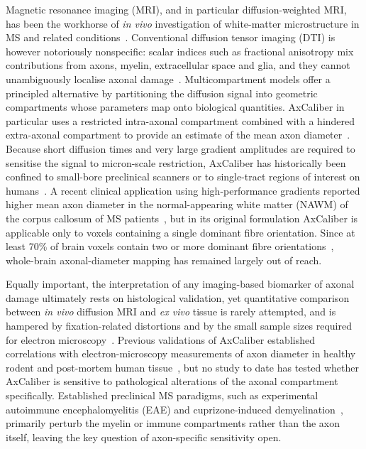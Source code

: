 \documentclass[11pt]{article}
\begin{document}
Magnetic resonance imaging (MRI), and in particular diffusion-weighted MRI, has been the workhorse of \emph{in vivo} investigation of white-matter microstructure in MS and related conditions~\cite{inglese2010diffusion}. Conventional diffusion tensor imaging (DTI) is however notoriously nonspecific: scalar indices such as fractional anisotropy mix contributions from axons, myelin, extracellular space and glia, and they cannot unambiguously localise axonal damage~\cite{desantis2014accuracy}. Multicompartment models offer a principled alternative by partitioning the diffusion signal into geometric compartments whose parameters map onto biological quantities. AxCaliber in particular uses a restricted intra-axonal compartment combined with a hindered extra-axonal compartment to provide an estimate of the mean axon diameter~\cite{assaf2008axcaliber,alexander2010orientationally,sepehrband2016towards}. Because short diffusion times and very large gradient amplitudes are required to sensitise the signal to micron-scale restriction, AxCaliber has historically been confined to small-bore preclinical scanners or to single-tract regions of interest on humans~\cite{jones2018microstructural,barazany2009invivo}. A recent clinical application using high-performance gradients reported higher mean axon diameter in the normal-appearing white matter (NAWM) of the corpus callosum of MS patients~\cite{desantis2019whole}, but in its original formulation AxCaliber is applicable only to voxels containing a single dominant fibre orientation. Since at least 70\% of brain voxels contain two or more dominant fibre orientations~\cite{jeurissen2013investigating}, whole-brain axonal-diameter mapping has remained largely out of reach.

Equally important, the interpretation of any imaging-based biomarker of axonal damage ultimately rests on histological validation, yet quantitative comparison between \emph{in vivo} diffusion MRI and \emph{ex vivo} tissue is rarely attempted, and is hampered by fixation-related distortions and by the small sample sizes required for electron microscopy~\cite{horowitz2015axon}. Previous validations of AxCaliber established correlations with electron-microscopy measurements of axon diameter in healthy rodent and post-mortem human tissue~\cite{barazany2009invivo,horowitz2015axon}, but no study to date has tested whether AxCaliber is sensitive to pathological alterations of the axonal compartment specifically. Established preclinical MS paradigms, such as experimental autoimmune encephalomyelitis (EAE) and cuprizone-induced demyelination~\cite{constantinescu2011eae,torkildsen2008cuprizone}, primarily perturb the myelin or immune compartments rather than the axon itself, leaving the key question of axon-specific sensitivity open.
\end{document}
